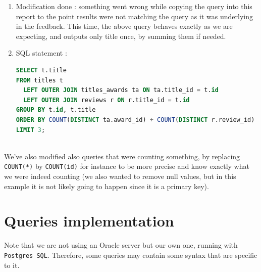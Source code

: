 \documentclass[doubleside, titlepage]{article}
\begin{document}
	\begin{enumerate}
	\item Modification done : something went wrong while copying the query into this report to the point results were not matching the query as it was underlying in the feedback. This time, the above query behaves exactly as we are expecting, and outputs only title once, by summing them if needed.
	\item SQL statement :
		\begin{lstlisting}[language=SQL,showspaces=false,basicstyle=\ttfamily,numberstyle=\tiny,commentstyle=\color{gray}]
SELECT t.title
FROM titles t
  LEFT OUTER JOIN titles_awards ta ON ta.title_id = t.id
  LEFT OUTER JOIN reviews r ON r.title_id = t.id
GROUP BY t.id, t.title
ORDER BY COUNT(DISTINCT ta.award_id) + COUNT(DISTINCT r.review_id) DESC
LIMIT 3;
		\end{lstlisting}

\end{enumerate}
~\\
We've also modified also queries that were counting something, by replacing \texttt{COUNT(*)} by \texttt{COUNT(id)} for instance to be more precise and know exactly what we were indeed counting (we also wanted to remove null values, but in this example it is not likely going to happen since it is a primary key).

\section{Queries implementation}

Note that we are not using an Oracle server but our own one, running with \texttt{Postgres SQL}. Therefore, some queries may contain some syntax that are specific to it.
\end{document}
